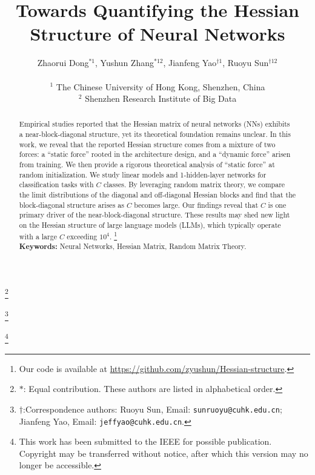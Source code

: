 \documentclass{article}
\newcommand{\1}{^{(1)}}
\newcommand{\2}{^{(2)}}
\newcommand\nnfootnote[1]{%
  \begin{NoHyper}
  \renewcommand\thefootnote{}\footnote{#1}%
  \addtocounter{footnote}{-1}%
  \end{NoHyper}
}
\begin{document}
\title{\fontsize{16.95pt}{20pt}\selectfont Towards Quantifying the Hessian Structure of Neural Networks}




\author{ Zhaorui Dong$^{*1}$, Yushun Zhang$^{* 12}$, Jianfeng Yao$^{\dagger 1}$, Ruoyu Sun$^{\dagger 12}$ \\
 \text{ }\\
   $^1$ The Chinese University of Hong Kong, Shenzhen, China \\
  $^2$ Shenzhen Research Institute of Big Data 
}












\maketitle
\nnfootnote{$*$: Equal contribution. These authors are listed in alphabetical order. }
\nnfootnote{$\dagger$:Correspondence authors: Ruoyu Sun, Email:  \texttt{sunruoyu@cuhk.edu.cn}; Jianfeng Yao, Email: \texttt{jeffyao@cuhk.edu.cn}.}
\nnfootnote{This work has been submitted to the IEEE for possible publication. Copyright may be transferred without notice, after which this version may no longer be accessible.}

\begin{abstract}

 Empirical studies reported that the Hessian matrix of neural networks (NNs) exhibits a near-block-diagonal structure, yet its theoretical foundation remains unclear. In this work, we reveal that the reported Hessian structure comes from a mixture of two forces: a ``static force'' rooted in the architecture design, and a ``dynamic force'' arisen from training. We then provide a rigorous theoretical analysis of ``static force'' at random initialization. We study linear models and 1-hidden-layer networks for classification tasks with $C$ classes.  By leveraging random matrix theory, we compare the limit distributions of the diagonal and off-diagonal Hessian blocks and find that the block-diagonal structure arises as $C$ becomes large. Our findings reveal that $C$ is one primary driver of the near-block-diagonal structure. These results may shed new light on the Hessian structure of large language models (LLMs), which  typically operate with a large $C$ exceeding $10^4$. 
 \footnote{Our code is available at \url{https://github.com/zyushun/Hessian-structure}.} 
\\
{\bf Keywords:} Neural Networks, Hessian Matrix, Random Matrix Theory.%
\end{abstract} 
\end{document}
